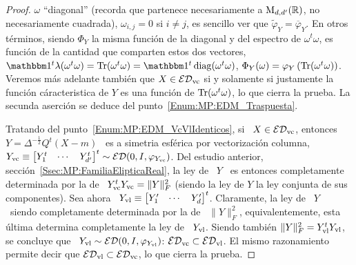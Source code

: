 \begin{proof}
  $\omega$    ``diagonal''    (recorda    que   partenece    necesariamente    a
  $\mathrm{M}_{d,d'}(\mathbb{R})$, \ie no necesariamente  cuadrada), \ie $\omega_{i,j} = 0$
  si   $i    \ne   j$,   es   sencillo   ver    que   $\widetilde{\varphi}_Y   =
  \overline{\varphi}_Y$. En otros t\'erminos, siendo $\Phi_Y$ la misma funci\'on
  de  la diagonal  y  del espectro  de  $\omega^t \omega$,  es  funci\'on de  la
  cantidad que comparten estos dos vectores, \ie $\un^t \lambda(\omega^t \omega)
  = \Tr( \omega^t \omega) = \un^t \diag(\omega^t \omega)$, \ie $\Phi_Y(\omega) =
  \varphi_Y\left(  \operatorname{Tr}(\omega^t   \omega)  \right)$.   Veremos   m\'as  adelante
  tambi\'en  que $X \in  \mathcal{ED}_{\mathrm{vc}}$ si  y solamente  si justamente  la funci\'on
  c\'aracteristica de  $Y$ es una funci\'on  de $\operatorname{Tr}( \omega^t  \omega)$, lo que
  cierra   la  prueba.    \newline   La  secunda   aserci\'on   se  deduce   del
  punto~\ref{Enum:MP:EDM_Traspuesta}.

  Tratando  del punto~\ref{Enum:MP:EDM_VcVlIdenticos}, si  \ $X  \in \mathcal{ED}_{\mathrm{vc}}$,
  entonces \  $Y = \Delta^{-\frac12} Q^t  (X-m)$ \ es a  simetria esf\'erica por
  vectorizaci\'on columna, \ie \  $Y_{\mathrm{vc}} \equiv \begin{bmatrix} Y_1^t & \cdots
    &  Y_{d'}^t \end{bmatrix}^t  \sim  \mathcal{ED}(0,I,\varphi_{Y_{\mathrm{vc}}})$. Del  estudio
  anterior, secci\'on~\ref{Ssec:MP:FamiliaElipticaReal},  la ley  de \ $Y$  \ es
  entonces  completamente determinada  por la  de \  $Y_{\mathrm{vc}}^t Y_{\mathrm{vc}}  =  \| Y
  \|_F^2$ (siendo la ley de $Y$ la ley conjunta de sus componentes). Sea ahora \
  $Y_{\mathrm{vl}}  \equiv  \begin{bmatrix}  Y'_1  &  \cdots  &  Y'_d  \end{bmatrix}^t$.
  Claramente, la ley de \ $Y$ \ siendo completamente determinada por la de \ $\|
  Y \|_F^2$, equivalentemente, esta \'ultima determina completamente la ley de \
  $Y_{\mathrm{vl}}$. Siendo tambi\'en $\| Y \|_F^2 = Y_{\mathrm{vl}}^t Y_{\mathrm{vl}}$, se concluye que
  \  $Y_{\mathrm{vl}} \sim  \mathcal{ED}(0,I,\varphi_{Y_{\mathrm{vl}}})$: $\mathcal{ED}_{\mathrm{vc}}  \subset \mathcal{ED}_{\mathrm{vl}}$.
  El mismo razonamiento permite decir  que $\mathcal{ED}_{\mathrm{vl}} \subset \mathcal{ED}_{\mathrm{vc}}$, lo que
  cierra la prueba.


\end{proof}
